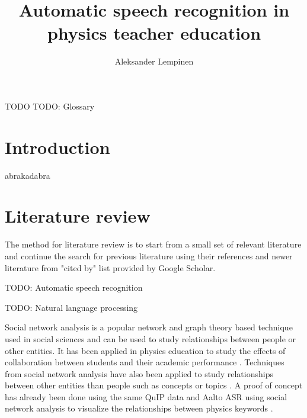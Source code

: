 \documentclass[utf8,english]{gradu3}
\begin{document}
\title{Automatic speech recognition in physics teacher education}

\author{Aleksander Lempinen}



\maketitle

\begin{thetermlist}
\item[TODO] TODO: Glossary
\end{thetermlist}

\mainmatter

\chapter{Introduction}

abrakadabra

\chapter{Literature review}

The method for literature review is to start from a small set of relevant literature and continue the search for previous literature using their references and newer literature from "cited by" list provided by Google Scholar.

TODO: Automatic speech recognition \parencite{hirsimaki2009importance,Mansikkaniemi2017}

TODO: Natural language processing \parencite{gambhir2017recent,tuhkala2018semi}

Social network analysis is a popular network and graph theory based technique used in social sciences \parencite{borgatti2009network} and can be used to study relationships between people or other entities. It has been applied in physics education to study the effects of collaboration between students and their academic performance \parencite{vargas2018correlation}. Techniques from social network analysis have also been applied to study relationships between other entities than people such as concepts or topics \parencite{mclinden2013concept}. A proof of concept has already been done using the same QuIP data and Aalto ASR using social network analysis to visualize the relationships between physics keywords \parencite{caballero2017asr}.
\end{document}
